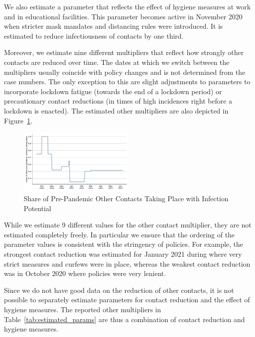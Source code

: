 We also estimate a parameter that reflects the effect of hygiene measures
at work and in educational facilities. This parameter becomes active in November 2020
when stricter mask mandates and distancing rules were introduced. It is estimated to
reduce infectiousness of contacts by one third.

Moreover, we estimate nine different multipliers that reflect how strongly other contacts
are reduced over time. The dates at which we switch between the multipliers usually
coincide with policy changes and is not determined from the case numbers. The only
exception to this are slight adjustments to parameters to incorporate lockdown fatigue
(towards the end of a lockdown period) or precautionary contact reductions (in times of
high incidences right before a lockdown is enacted). The estimated other multipliers are
also depicted in Figure~\ref{fig:other_multiplier}.

\begin{figure}
    \centering
    \includegraphics[width=0.5\textwidth]{figures/results/figures/data/other_multiplier}
    \caption{Share of Pre-Pandemic Other Contacts Taking Place with Infection Potential}
    \label{fig:other_multiplier}
\end{figure}

While we estimate 9 different values for the other contact multiplier, they are not
estimated completely freely. In particular we ensure that the ordering of the parameter
values is consistent with the stringency of policies. For example, the strongest
contact reduction was estimated for January 2021 during where very strict measures
and curfews were in place, whereas the weakest contact reduction was in October 2020
where policies were very lenient.

Since we do not have good data on the reduction of other contacts, it is not possible
to separately estimate parameters for contact reduction and the effect of hygiene
measures. The reported other multipliers in Table~\ref{tab:estimated_params} are thus
a combination of contact reduction and hygiene measures.

